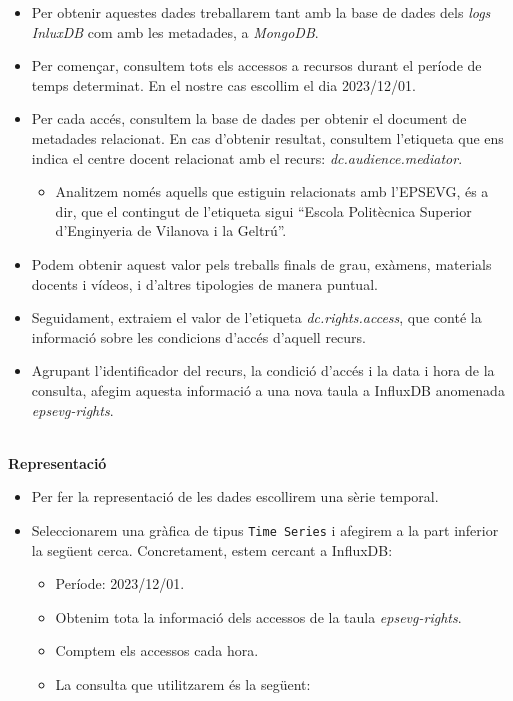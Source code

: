 \begin{itemize}
    \item Per obtenir aquestes dades treballarem tant amb la base de dades dels \textit{\gls{log}s} \textit{InluxDB} com amb les metadades, a \textit{MongoDB}.
    \item Per començar, consultem tots els accessos a recursos durant el període de temps determinat.
    En el nostre cas escollim el dia 2023/12/01.
    \item Per cada accés, consultem la base de dades per obtenir el document de metadades relacionat.
    En cas d'obtenir resultat, consultem l'etiqueta que ens indica el centre docent relacionat amb el recurs: \textit{dc.audience.mediator}.
    \begin{itemize}
        \item Analitzem només aquells que estiguin relacionats amb l'EPSEVG, és a dir, que el contingut de l'etiqueta sigui ``Escola Politècnica Superior d'Enginyeria de Vilanova i la Geltrú''.
    \end{itemize}
    \item Podem obtenir aquest valor pels treballs finals de grau, exàmens, materials docents i vídeos, i d'altres tipologies de manera puntual.
    \item Seguidament, extraiem el valor de l'etiqueta \textit{dc.rights.access}, que conté la informació sobre les condicions d'accés d'aquell recurs.
    \item Agrupant l'identificador del recurs, la condició d'accés i la data i hora de la consulta, afegim aquesta informació a una nova taula a InfluxDB anomenada \textit{epsevg-rights}.

\end{itemize}

\clearpage

\noindent \\
\textbf{Representació}

\begin{itemize}
    \item Per fer la representació de les dades escollirem una sèrie temporal.
    \item Seleccionarem una gràfica de tipus \texttt{Time Series} i afegirem a la part inferior la següent cerca.
    Concretament, estem cercant a InfluxDB:
    \begin{itemize}
        \item Període: 2023/12/01.
        \item Obtenim tota la informació dels accessos de la taula \textit{epsevg-rights}.
        \item Comptem els accessos cada hora.
        \item La consulta que utilitzarem és la següent:
    \end{itemize}
\end{itemize}

